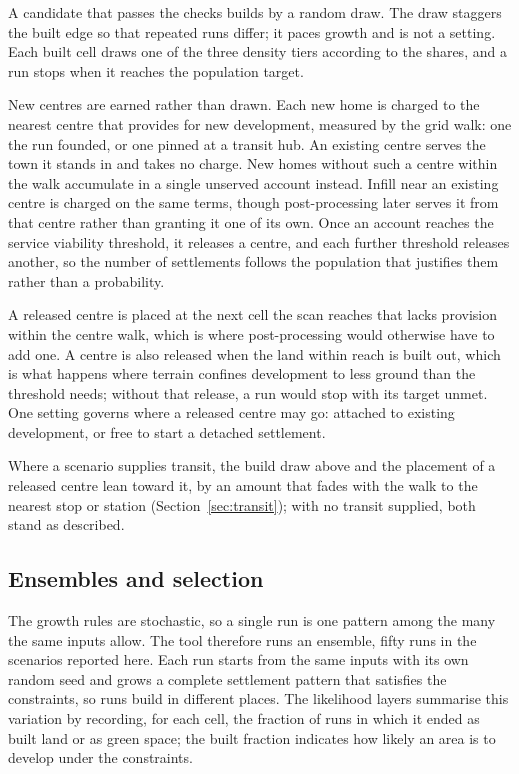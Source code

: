 \documentclass[11pt]{article}
\begin{document}
A candidate that passes the checks builds by a random draw. The draw
staggers the built edge so that repeated runs differ; it paces
growth and is not a setting. Each built
cell draws one of the three density tiers
according to the shares, and a run stops when it reaches the
population target.

New centres are earned rather than drawn. Each new home is charged to
the nearest centre that provides for new development, measured by the
grid walk: one the run founded, or one pinned at a transit hub. An
existing centre serves the town it stands in and takes no charge. New
homes without such a centre within the walk accumulate in a single
unserved account instead. Infill near an existing centre is charged
on the same terms, though post-processing later serves it from that
centre rather than granting it one of its own. Once an account reaches the service
viability threshold, it releases a centre, and each further threshold
releases another, so the number of settlements follows the population
that justifies them rather than a probability.

A released centre is placed at the next cell the scan reaches that
lacks provision within the centre walk, which is where post-processing
would otherwise have to add one. A centre is also released when the
land within reach is built out, which is what happens where terrain
confines development to less ground than the threshold needs; without
that release, a run would stop with its target unmet. One setting
governs where a released centre may go: attached to existing
development, or free to start a detached settlement.

Where a scenario supplies transit, the build draw above and the
placement of a released centre lean toward it, by an amount that fades
with the walk to the nearest stop or station
(Section~\ref{sec:transit}); with no transit supplied, both stand
as described.

\subsection{Ensembles and selection}
\label{sec:ensemble}

The growth rules are stochastic, so a single run is one pattern
among the many the same inputs allow. The tool therefore runs an
ensemble, fifty runs in the scenarios reported here. Each run
starts from the same inputs with its own random seed and grows a
complete settlement pattern that satisfies the constraints, so
runs build in different places. The likelihood layers
summarise this variation by recording, for each cell, the fraction
of runs in which it ended as built land or as green space; the built
fraction indicates how likely an area is to develop under the
constraints.
\end{document}
